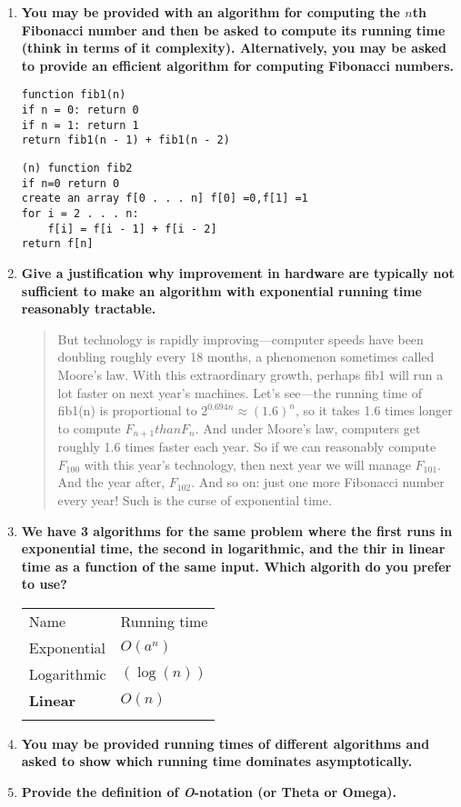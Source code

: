 \documentclass[a4paper,11pt]{article}
\begin{document}
\begin{enumerate}
\def\labelenumi{\arabic{enumi}.}
\item
  \textbf{You may be provided with an algorithm for computing the $n$th
  Fibonacci number and then be asked to compute its running time (think
  in terms of it complexity). Alternatively, you may be asked to provide
  an efficient algorithm for computing Fibonacci numbers.}

\begin{verbatim}
function fib1(n) 
if n = 0: return 0
if n = 1: return 1
return fib1(n - 1) + fib1(n - 2)
\end{verbatim}

\begin{verbatim}
(n) function fib2
if n=0 return 0
create an array f[0 . . . n] f[0] =0,f[1] =1
for i = 2 . . . n:
    f[i] = f[i - 1] + f[i - 2] 
return f[n]
\end{verbatim}
\item
  \textbf{Give a justification why improvement in hardware are typically
  not sufficient to make an algorithm with exponential running time
  reasonably tractable.}

  \begin{quote}
  But technology is rapidly improving---computer speeds have been
  doubling roughly every 18 months, a phenomenon sometimes called
  Moore's law. With this extraordinary growth, perhaps fib1 will run a
  lot faster on next year's machines. Let's see---the running time of
  fib1(n) is proportional to $2^{0.694n} \approx (1.6)^n$, so it takes
  1.6 times longer to compute $F_{n+1} than F_n$. And under Moore's law,
  computers get roughly 1.6 times faster each year. So if we can
  reasonably compute $F_{100}$ with this year's technology, then next
  year we will manage $F_{101}$. And the year after, $F_{102}$. And so
  on: just one more Fibonacci number every year! Such is the curse of
  exponential time.
  \end{quote}
\item
  \textbf{We have 3 algorithms for the same problem where the first runs
  in exponential time, the second in logarithmic, and the thir in linear
  time as a function of the same input. Which algorith do you prefer to
  use?}

  \begin{longtable}[c]{@{}ll@{}}
  \toprule\addlinespace
  Name & Running time
  \\\addlinespace
  \midrule\endhead
  Exponential & $O(a^n)$
  \\\addlinespace
  Logarithmic & $(\log(n))$
  \\\addlinespace
  \textbf{Linear} & $O(n)$
  \\\addlinespace
  \bottomrule
  \end{longtable}
\item
  \textbf{You may be provided running times of different algorithms and
  asked to show which running time dominates asymptotically.}
\item
  \textbf{Provide the definition of \emph{O}-notation (or Theta or
  Omega).}


\end{enumerate}
\end{document}
